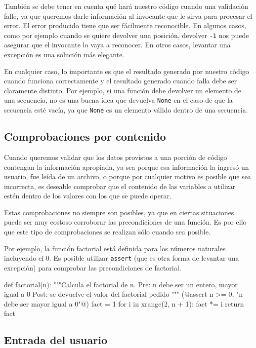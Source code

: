También se debe tener en cuenta qué hará nuestro código cuando una
validación falle, ya que queremos darle información al invocante que le sirva
para procesar el error. El error producido tiene que ser fácilmente
reconocible.  En algunos casos, como por ejemplo cuando se quiere devolver
una posición, devolver \lstinline!-1! nos puede asegurar que el invocante
lo vaya a reconocer. En otros casos, levantar una excepción es una solución
más elegante.

En cualquier caso, lo importante es que el resultado generado por nuestro
código cuando funciona correctamente y el resultado generado cuando falla
debe ser claramente distinto. Por ejemplo, si una función debe devolver un
elemento de una secuencia, no es una buena idea que devuelva
\lstinline!None! en el caso de que la secuencia esté vacía, ya que
\lstinline!None! es un elemento válido dentro de una secuencia.

\subsection{Comprobaciones por contenido}

Cuando queremos validar que los datos provistos a una porción de código
contengan la información apropiada, ya sea porque esa información la ingresó
un usuario, fue leída de un archivo, o porque por cualquier motivo es posible
que sea incorrecta, es deseable comprobar que el contenido de las variables a
utilizar estén dentro de los valores con los que se puede operar.

Estas comprobaciones no siempre son posibles, ya que en ciertas situaciones
puede ser muy costoso corroborar las precondiciones de una función. Es por
ello que este tipo de comprobaciones se realizan sólo cuando sea posible.

Por ejemplo, la función factorial está definida para los números naturales
incluyendo el 0. Es posible utilizar \lstinline!assert! (que es otra forma de
levantar una excepción) para comprobar las precondiciones de factorial.

\begin{codigo-python}
def factorial(n):
    """Calcula el factorial de n.
    Pre: n debe ser un entero, mayor igual a 0
    Post: se devuelve el valor del factorial pedido
    """
    (@assert n >= 0, "n debe ser mayor igual a 0"@)
    fact = 1
    for i in xrange(2, n + 1):
        fact *= i
    return fact
\end{codigo-python}

\subsection{Entrada del usuario}

